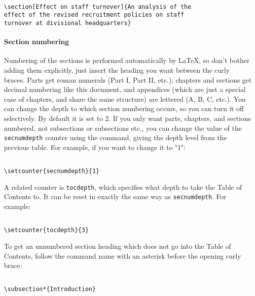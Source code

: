 \begin{lstlisting}

\section[Effect on staff turnover]{An analysis of the
effect of the revised recruitment policies on staff
turnover at divisional headquarters}

\end{lstlisting}


\paragraph{ Section numbering }

Numbering of the sections is performed automatically by LaTeX, so don't bother adding them explicitly, just insert the heading you want between the curly braces. 
Parts get roman numerals (Part I, Part II, etc.); chapters and sections get decimal numbering like this document, and appendices (which are just a special case of chapters, and share the same structure) are lettered (A, B, C, etc.). You can change the depth to which section numbering occurs, so you can turn it off selectively. By default it is set to 2. If you only want parts, chapters, and sections numbered, not subsections or subsections etc., you can change the value
of the \texttt{secnumdepth} counter using the \texttt{\setcounter} command, giving the depth level from the previous table. For example, if you want to change it to "1":

\begin{lstlisting}

\setcounter{secnumdepth}{1}

\end{lstlisting}


A related counter is \texttt{tocdepth}, which specifies what depth to take the Table of Contents to. It can be reset in exactly the
same way as \texttt{secnumdepth}. For example:

\begin{lstlisting}

\setcounter{tocdepth}{3}

\end{lstlisting}


To get an unnumbered section heading which does not go into the Table of Contents, follow the command name with an asterisk before the opening curly brace:

\begin{lstlisting}

\subsection*{Introduction}

\end{lstlisting}


